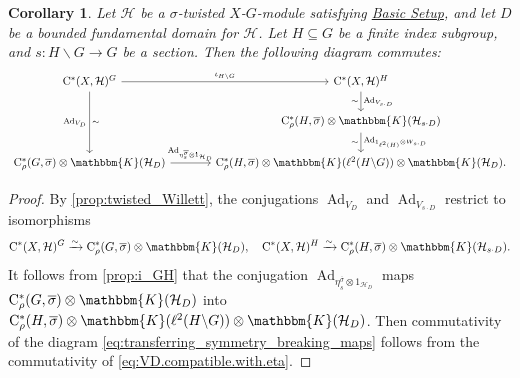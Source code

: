 \documentclass{amsart}
\numberwithin{figure}{section}
\numberwithin{equation}{section}
\numberwithin{table}{section}
\theoremstyle{plain}
\newtheorem{corollary}[equation]{Corollary}
\theoremstyle{definition}
\theoremstyle{remark}
\theoremstyle{nonumber}
\newcommand{\refbasicsetup}{\hyperref[basic_setup]{Basic Setup}}
\newcommand{\Cpt}{\mathbb{K}}
\newcommand{\Cst}{\relax\ifmmode\mathrm{C}^*\else\textup{C*}\fi}
\newcommand{\Cstr}{\Cst_\rho} %
\newcommand{\Ad}{\operatorname{Ad}} %
\renewcommand{\mathbb}{\mathbbm} %
\begin{document}
\begin{corollary}\label{cor:VsD.related.to.eta.s}
Let \( \mathcal{H} \) be a \( \sigma \)-twisted \( X \)-\( G \)-module
satisfying \refbasicsetup, and let \( D \) be a bounded fundamental domain for
\( \mathcal{H} \).
Let $H\subseteq G$ be a finite index subgroup, and $s\colon H\backslash
G\to G$ be a section. Then the following diagram commutes:
\begin{equation}\label{eq:transferring_symmetry_breaking_maps}
\begin{tikzcd}[column sep=large]
\Cst(X,\mathcal{H})^G \arrow[r, "\iota_{H\backslash G}"] 
\arrow[dd, "\Ad_{V_D}"', "\sim"] &
\Cst(X,\mathcal{H})^H \arrow[d, "\Ad_{V_{s\cdot D}}", "\sim"']  \\
& 
\Cstr(H,\overline{\sigma})\otimes\Cpt(\mathcal{H}_{s\cdot D}) \arrow[d, "\Ad_{1_{\ell^2(H)}\otimes W_{s\cdot D}}", "\sim"'] \\
\Cstr(G,\overline{\sigma})\otimes\Cpt(\mathcal{H}_D) \arrow[r, "\Ad_{\eta_s^{\overline{\sigma}}\otimes
1_{\mathcal{H}_D}}"] &
\Cstr(H,\overline{\sigma})\otimes\Cpt(\ell^2(H\backslash G))\otimes\Cpt(\mathcal{H}_D).
\end{tikzcd} 
\end{equation}
\end{corollary}

\begin{proof}
By \cref{prop:twisted_Willett}, the conjugations \( \Ad_{V_D} \) and \( \Ad_{V_{s\cdot D}} \) restrict to isomorphisms
\[ 
\Cst(X,\mathcal{H})^G\xrightarrow{\sim}\Cstr(G,\overline{\sigma})\otimes\Cpt(\mathcal{H}_D),\quad
\Cst(X,\mathcal{H})^H\xrightarrow{\sim}\Cstr(H,\overline{\sigma})\otimes\Cpt(\mathcal{H}_{s\cdot
D}).
\]
It follows from \cref{prop:i_GH} that 
the conjugation \( \Ad_{\eta_{s}^{\overline{\sigma}}\otimes1_{\mathcal{H}_D}} \) maps \(
\Cstr(G,\overline{\sigma})\otimes\Cpt(\mathcal{H}_D)\) into \(
\Cstr(H,\overline{\sigma})\otimes\Cpt(\ell^2(H\backslash G))\otimes\Cpt(\mathcal{H}_D) \).
Then commutativity of the diagram \eqref{eq:transferring_symmetry_breaking_maps} follows from the commutativity of
\eqref{eq:VD.compatible.with.eta}.  
\end{proof}
\end{document}
